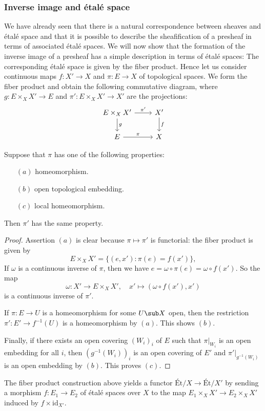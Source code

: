\subsubsection{Inverse image and \'etal\'e space}
We have already seen that there is a natural correspondence between sheaves and étalé space and that it is possible to describe the sheafification of a presheaf in terms of associated étalé spaces. We will now show that the formation of the inverse image of a presheaf has a simple description in terms of étalé spaces: The corresponding étalé space is given by the fiber product. Hence let us consider continuous maps $f:X'\to X$ and $\pi:E\to X$ of topological spaces. We form the fiber product and obtain the following commutative diagram, where $g:E\times_XX'\to E$ and $\pi':E\times_XX'\to X'$ are the projections:
\[\begin{tikzcd}
E\times_XX'\ar[r,"\pi'"]\ar[d,"g"]&X'\ar[d,"f"]\\
E\ar[r,"\pi"]&X
\end{tikzcd}\]
\begin{lemma}\label{pull back diagram prop}
Suppose that $\pi$ has one of the following properties:
\begin{itemize}
\item[$(a)$] homeomorphism.
\item[$(b)$] open topological embedding.
\item[$(c)$] local homeomorphism.
\end{itemize}
Then $\pi'$ has the same property.
\end{lemma}
\begin{proof}
Assertion $(a)$ is clear because $\pi\mapsto\pi'$ is functorial: the fiber product is given by
\[E\times_XX'=\{(e,x'):\pi(e)=f(x')\},\]
If $\omega$ is a continuous inverse of $\pi$, then we have $e=\omega\circ\pi(e)=\omega\circ f(x')$. So the map
\[\omega:X'\to E\times_XX',\quad x'\mapsto(\omega\circ f(x'),x')\]
is a continuous inverse of $\pi'$.\par
If $\pi:E\to U$ is a homeomorphism for some $U\sub X$ open, then the restriction  $\pi':E'\to f^{-1}(U)$ is a homeomorphism by $(a)$. This shows $(b)$.\par
Finally, if there exists an open covering $(W_i)_i$ of $E$ such that $\pi|_{W_i}$ is an open embedding for all $i$, then $(g^{-1}(W_i))_i$ is an open covering of $E'$ and $\pi'|_{g^{-1}(W_i)}$ is an open embedding by $(b)$. This proves $(c)$.
\end{proof}
The fiber product construction above yields a functor $\text{Ét/}X\to\text{Ét/}X'$ by sending a morphism $f:E_1\to E_2$ of étalé spaces over $X$ to the map $E_1\times_XX'\to E_2\times_XX'$ induced by $f\times\mathrm{id}_{X'}$.
